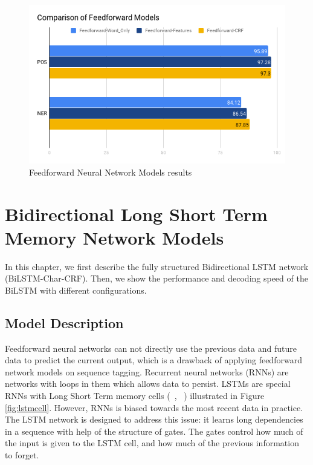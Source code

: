 \documentclass{sfuthesis}
\begin{document}
\begin{figure}
  \centering
  \includegraphics[scale=0.6]{ff.png}
 \caption{Feedforward Neural Network Models results}
  \label{fig:ff}
\end{figure}



\chapter{Bidirectional Long Short Term Memory Network Models}
In this chapter, we first describe the fully structured Bidirectional LSTM network (BiLSTM-Char-CRF). Then, we show the performance and decoding speed of the BiLSTM with different configurations.

\section{Model Description}
Feedforward neural networks can not directly use the previous data and future data to predict the current output, which is a drawback of applying feedforward network models on sequence tagging. 
Recurrent neural networks (RNNs) are networks with loops in them which allows data to persist. LSTMs are special RNNs with Long Short Term memory cells (~\citeauthor{graves2005framewise}, ~\citeyear{graves2005framewise}) illustrated in Figure \ref{fig:lstmcell}. However, RNNs is biased towards the most recent data in practice. The LSTM network is designed to address this issue: it learns long dependencies in a sequence with help of the structure of gates. The gates control how much of the input is given to the LSTM cell, and how much of the previous information to forget. 
\end{document}

